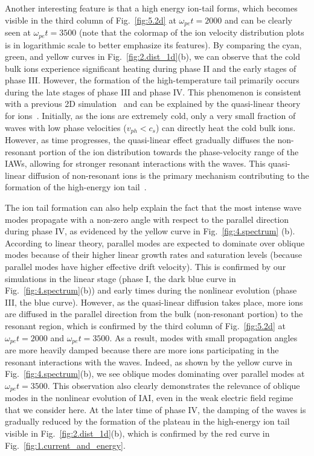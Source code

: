 \documentclass[%
 reprint,
 amsmath,
 amssymb,
 aps,
 prx,
floatfix,
superscriptaddress
]{revtex4-2}
\begin{document}
Another interesting feature is that a high energy ion-tail forms, which becomes visible in the third column of Fig.~\ref{fig:5.2d} at $\omega_{pe}t=2000$ and can be clearly seen at $\omega_{pe}t=3500$ (note that the colormap of the ion velocity distribution plots is in logarithmic scale to better emphasize its features).
By comparing the cyan, green, and yellow curves in Fig.~\ref{fig:2.dist_1d}(b), we can observe that the cold bulk ions experience significant heating during phase II and the early stages of phase III. However, the formation of the high-temperature tail primarily occurs during the late stages of phase III and phase IV.
This phenomenon is consistent with a previous 2D simulation~\cite{dum1974turbulent} and can be explained by the quasi-linear theory for ions~\cite{ishihara1981quasilinear}.
Initially, as the ions are extremely cold, only a very small fraction of waves with low phase velocities ($v_{ph}<c_s$) can directly heat the cold bulk ions. 
However, as time progresses, the quasi-linear effect gradually diffuses the non-resonant portion of the ion distribution towards the phase-velocity range of the IAWs, allowing for stronger resonant interactions with the waves.
This quasi-linear diffusion of non-resonant ions is the primary mechanism contributing to the formation of the high-energy ion tail~\cite{ishihara1981quasilinear,ishihara1983quasilinear}. 

The ion tail formation can also help explain the fact that the most intense wave modes propagate with a non-zero angle with respect to the parallel direction during phase IV, as evidenced by the yellow curve in Fig.~\ref{fig:4.spectrum} (b).
According to linear theory, parallel modes are expected to dominate over oblique modes because of their higher linear growth rates and saturation levels (because parallel modes have higher effective drift velocity).
This is confirmed by our simulations in the linear stage (phase I, the dark blue curve in Fig.~\ref{fig:4.spectrum}(b)) and early times during the nonlinear evolution (phase III, the blue curve).
However, as the quasi-linear diffusion takes place, more ions are diffused in the parallel direction from the bulk (non-resonant portion) to the resonant region, which is confirmed by the third column of Fig.~\ref{fig:5.2d} at $\omega_{pe}t=2000$ and $\omega_{pe}t=3500$.
As a result, modes with small propagation angles are more heavily damped because there are more ions participating in the resonant interactions with the waves.
Indeed, as shown by the yellow curve in Fig.~\ref{fig:4.spectrum}(b), we see oblique modes dominating over parallel modes at $\omega_{pe}t=3500$.
This observation also clearly demonstrates the relevance of oblique modes in the nonlinear evolution of IAI, even in the weak electric field regime that we consider here.
At the later time of phase IV, the damping of the waves is gradually reduced by the formation of the plateau in the high-energy ion tail visible in Fig.~\ref{fig:2.dist_1d}(b), which is confirmed by the red curve in Fig.~\ref{fig:1.current_and_energy}.
\end{document}
